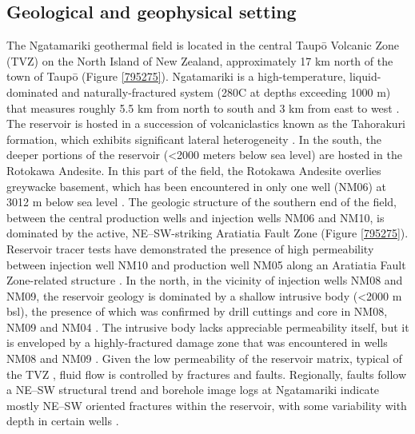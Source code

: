 \subsection{Geological and geophysical setting} \label{Setting}
The Ngatamariki geothermal field is located in the central Taup\={o} Volcanic Zone (TVZ) on the North Island of New Zealand, approximately 17 km north of the town of Taup\={o} (Figure \ref{795275}). Ngatamariki is a high-temperature, liquid-dominated and naturally-fractured system (280\textdegree{}C at depths exceeding 1000 m) that measures roughly 5.5 km from north to south and 3 km from east to west \citep{Bignall_2009,Chambefort_2014}. The reservoir is hosted in a succession of volcaniclastics known as the Tahorakuri formation, which exhibits significant lateral heterogeneity \citep{Chambefort_2014}. In the south, the deeper portions of the reservoir (\textless2000 meters below sea level) are hosted in the Rotokawa Andesite. In this part of the field, the Rotokawa Andesite overlies greywacke basement, which has been encountered in only one well (NM06) at 3012 m below sea level \citep{Chambefort_2014}. The geologic structure of the southern end of the field, between the central production wells and injection wells NM06 and NM10, is dominated by the active, NE--SW-striking Aratiatia Fault Zone (Figure \ref{795275}). Reservoir tracer tests have demonstrated the presence of high permeability between injection well NM10 and production well NM05 along an Aratiatia Fault Zone-related structure \citep{buscarlet_2015}. In the north, in the vicinity of injection wells NM08 and NM09, the reservoir geology is dominated by a shallow intrusive body (\textless 2000 m bsl), the presence of which was confirmed by drill cuttings and core in NM08, NM09 and NM04 \citep{Bignall_2009,Chambefort_2014}. The intrusive body lacks appreciable permeability itself, but it is enveloped by a highly-fractured damage zone that was encountered in wells NM08 and NM09 \citep{Clearwater_2015}. Given the low permeability of the reservoir matrix, typical of the TVZ \citep{Sibson_2003}, fluid flow is controlled by fractures and faults. Regionally, faults follow a NE--SW structural trend and borehole image logs at Ngatamariki indicate mostly NE--SW oriented fractures within the reservoir, with some variability with depth in certain wells \citep{Bignall_2009,Massiot_2015,massiot_2012}.

